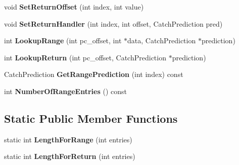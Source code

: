 \begin{DoxyCompactItemize}
\item 
void {\bfseries Set\+Return\+Offset} (int index, int value)\hypertarget{classv8_1_1internal_1_1_handler_table_a6bd921328864fc0f64c8b4a606c28dfb}{}\label{classv8_1_1internal_1_1_handler_table_a6bd921328864fc0f64c8b4a606c28dfb}

\item 
void {\bfseries Set\+Return\+Handler} (int index, int offset, Catch\+Prediction pred)\hypertarget{classv8_1_1internal_1_1_handler_table_a0037c4edb3c7fcd49f689ef94dada952}{}\label{classv8_1_1internal_1_1_handler_table_a0037c4edb3c7fcd49f689ef94dada952}

\item 
int {\bfseries Lookup\+Range} (int pc\+\_\+offset, int $\ast$data, Catch\+Prediction $\ast$prediction)\hypertarget{classv8_1_1internal_1_1_handler_table_afbfa1c81a6e8f7322bcf40bd16f71cf9}{}\label{classv8_1_1internal_1_1_handler_table_afbfa1c81a6e8f7322bcf40bd16f71cf9}

\item 
int {\bfseries Lookup\+Return} (int pc\+\_\+offset, Catch\+Prediction $\ast$prediction)\hypertarget{classv8_1_1internal_1_1_handler_table_a0ac8ce8fdd190e79f8584075151f605b}{}\label{classv8_1_1internal_1_1_handler_table_a0ac8ce8fdd190e79f8584075151f605b}

\item 
Catch\+Prediction {\bfseries Get\+Range\+Prediction} (int index) const \hypertarget{classv8_1_1internal_1_1_handler_table_a525c5fd3e9f8376a6fdb58b3e82da2c8}{}\label{classv8_1_1internal_1_1_handler_table_a525c5fd3e9f8376a6fdb58b3e82da2c8}

\item 
int {\bfseries Number\+Of\+Range\+Entries} () const \hypertarget{classv8_1_1internal_1_1_handler_table_a2f4560aa940fc417477c467747e493e9}{}\label{classv8_1_1internal_1_1_handler_table_a2f4560aa940fc417477c467747e493e9}

\end{DoxyCompactItemize}
\subsection*{Static Public Member Functions}
\begin{DoxyCompactItemize}
\item 
static int {\bfseries Length\+For\+Range} (int entries)\hypertarget{classv8_1_1internal_1_1_handler_table_a264f70278bb2cb6772b5e05cf77ad7fe}{}\label{classv8_1_1internal_1_1_handler_table_a264f70278bb2cb6772b5e05cf77ad7fe}

\item 
static int {\bfseries Length\+For\+Return} (int entries)\hypertarget{classv8_1_1internal_1_1_handler_table_a3c5cd622dbe4aaf12a506e2991f1e8bb}{}\label{classv8_1_1internal_1_1_handler_table_a3c5cd622dbe4aaf12a506e2991f1e8bb}

\end{DoxyCompactItemize}
